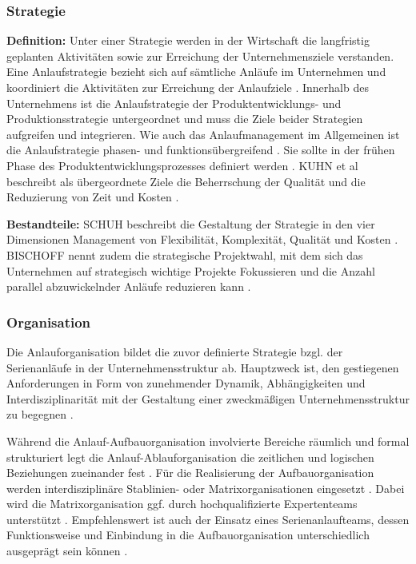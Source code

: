 \subsubsection*{Strategie}
\textbf{Definition:}
Unter einer Strategie werden in der Wirtschaft die langfristig geplanten Aktivitäten sowie zur Erreichung der Unternehmensziele verstanden. %
Eine Anlaufstrategie bezieht sich auf sämtliche Anläufe im Unternehmen und koordiniert die Aktivitäten zur Erreichung der Anlaufziele \cite[4]{Schuh2008}. Innerhalb des Unternehmens ist die Anlaufstrategie der Produktentwicklungs- und Produktionsstrategie untergeordnet und muss die Ziele beider Strategien aufgreifen und integrieren. %
Wie auch das Anlaufmanagement im Allgemeinen ist die Anlaufstrategie phasen- und funktionsübergreifend \cite{Pfohl2000}. %
Sie sollte in der frühen Phase des Produktentwicklungsprozesses definiert werden \cite{Schuh2004}. 
KUHN et al beschreibt als übergeordnete Ziele die Beherrschung der Qualität und die Reduzierung von Zeit und Kosten \cite[4]{Kuhn2002}. 

\textbf{Bestandteile:}
SCHUH beschreibt die Gestaltung der Strategie in den vier Dimensionen Management von Flexibilität, Komplexität, Qualität und Kosten \cite[13]{Schuh2008}. BISCHOFF nennt zudem die strategische Projektwahl, mit dem sich das Unternehmen auf strategisch wichtige Projekte Fokussieren und die Anzahl parallel abzuwickelnder Anläufe reduzieren kann \cite[43]{Bischoff2007}. 



\subsubsection*{Organisation}
Die Anlauforganisation bildet die zuvor definierte Strategie bzgl. der Serienanläufe in der Unternehmensstruktur ab. Hauptzweck ist, den gestiegenen Anforderungen in Form von zunehmender Dynamik, Abhängigkeiten und Interdisziplinarität mit der Gestaltung einer zweckmäßigen Unternehmensstruktur zu begegnen \cite[55]{Schuh2008}. 

Während die Anlauf-Aufbauorganisation involvierte Bereiche räumlich und formal strukturiert legt die Anlauf-Ablauforganisation die zeitlichen und logischen Beziehungen zueinander fest \cite[55]{Schuh2008}.
Für die Realisierung der Aufbauorganisation werden interdisziplinäre Stablinien- oder Matrixorganisationen eingesetzt \cite[77]{Bischoff2007}. Dabei wird die Matrixorganisation ggf. durch hochqualifizierte Expertenteams unterstützt \cite[4]{Schmitt2015}. %
Empfehlenswert ist auch der Einsatz eines Serienanlaufteams, dessen Funktionsweise und Einbindung in die Aufbauorganisation unterschiedlich ausgeprägt sein können \cite[79]{Bischoff2007}. 





